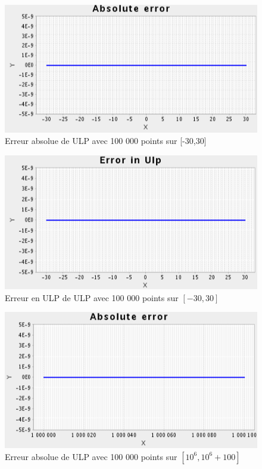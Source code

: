 \documentclass[12pt]{article}
\begin{document}
\begin{figure}[h!]
  \begin{center}
    \includegraphics[scale=0.33]{ulp_abs.png}
    \caption{Erreur absolue de ULP avec 100 000 points sur [-30,30]}
    \label{Erreur absolue de ULP avec 100 000 points sur [-30,30]}
  \end{center}
\end{figure}
\begin{figure}[h!]
  \begin{center}
    \includegraphics[scale=0.33]{ulp_ulp.png}
    \caption{Erreur en ULP de ULP avec 100 000 points sur $[-30,30]$}
    \label{Erreur en ULP de ULP avec 100 000 points sur $[-30,30]$}
  \end{center}
\end{figure}
\newpage

\begin{figure}[h!]
  \begin{center}
    \includegraphics[scale=0.33]{ulp_far.png}
    \caption{Erreur absolue de ULP avec 100 000 points sur $[10^6,10^6+100]$}
    \label{Erreur absolue de ULP avec 100 000 points sur $[10^6,10^6+100]$}
  \end{center}
\end{figure}
\end{document}
